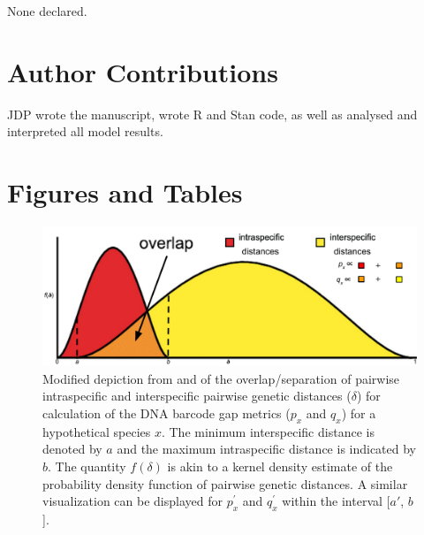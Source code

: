 \documentclass[12pt]{article}
\begin{document}
None declared.

\section*{Author Contributions}

JDP wrote the manuscript, wrote R and Stan code, as well as analysed and interpreted all model results. 




\section*{Figures and Tables}

\begin{figure}[H]

\centering

\includegraphics[width=1.0\textwidth]{Figure 1}

\caption{Modified depiction from \citet{meyer2005dna} and \citet{phillips2024measure} of the overlap/separation of pairwise intraspecific and interspecific pairwise genetic distances ($\delta$) for calculation of the DNA barcode gap metrics ($p_x$ and $q_x$) for a hypothetical species $x$. The minimum interspecific distance is denoted by $a$ and the maximum intraspecific distance is indicated by $b$. The quantity $f(\delta)$ is akin to a kernel density estimate of the probability density function of pairwise genetic distances. A similar visualization can be displayed for $p^{'}_x$ and $q^{'}_x$ within the interval [$a'$, $b$].}

\end{figure}
\end{document}
